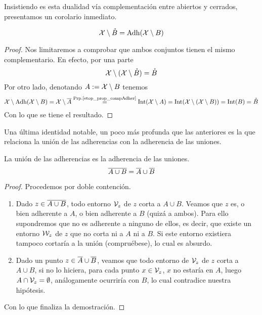 Insistiendo es esta dualidad vía complementación entre abiertos y cerrados, presentamos un corolario inmediato.
\begin{cor}
	\label{etop_cor_compInter}
	\begin{equation*}
	\mathcal{X}\setminus\mathring{B}=\operatorname{\mathrm{Adh}}(\mathcal{X} \setminus B)
	\end{equation*}
\end{cor}
\begin{proof}
	Nos limitaremos a comprobar que ambos conjuntos tienen el mismo complementario. En efecto, por una parte
	\begin{equation*}
	\mathcal{X} \setminus (\mathcal{X} \setminus \mathring{B}) = \mathring{B}
	\end{equation*}
	Por otro lado, denotando $A:=\mathcal{X} \setminus B$ tenemos
	\begin{equation*}
	\mathcal{X} \setminus \operatorname{\mathrm{Adh}}(\mathcal{X} \setminus B)=\mathcal{X} \setminus \overline{A}\stackrel{\textrm{Prp.\ref{etop_prop_compAdher}}}{=}\operatorname{\mathrm{Int}}(\mathcal{X} \setminus A)=\operatorname{\mathrm{Int}}(\mathcal{X} \setminus (\mathcal{X} \setminus B))=\operatorname{\mathrm{Int}}(B)=\mathring{B}
	\end{equation*}
	Con lo que se tiene el resultado.
\end{proof}
Una última identidad notable, un poco más profunda que las anteriores es la que relaciona la unión de las adherencias con la adherencia de las uniones.
\begin{prop}
	La unión de las adherencias es la adherencia de las uniones.
	\label{etop_prop_unionAdher}
	\begin{equation*}
	\overline{A\cup B}=\overline{A}\cup\overline{B}
	\end{equation*}
\end{prop}
\begin{proof}
	Procedemos por doble contención.
	\begin{enumerate}
		\item[\bsubset] 
		Dado $z\in \overline{A\cup B}$, todo entorno $\mathcal{V}_z$ de $z$ corta a $A\cup B$. Veamos que $z$ es, o bien adherente a $A$, o bien adherente a $B$ (quizá a ambos). Para ello supondremos que no es adherente a ninguno de ellos, es decir, que existe un entorno $\mathcal{W}_z$ de $z$ que no corta ni a $A$ ni a $B$. Si este entorno existiera tampoco cortaría a la unión (compruébese), lo cual es absurdo.
		\item[\bsupset]
		Dado un punto $z\in\overline{A}\cup\overline{B}$, veamos que todo entorno de $\mathcal{V}_z$ de $z$ corta a $A\cup B$, si no lo hiciera, para cada punto $x\in\mathcal{V}_z$, $x$ no estaría en $A$, luego $A\cap \mathcal{V}_z=\emptyset$, análogamente ocurriría con $B$, lo cual contradice nuestra hipótesis.
	\end{enumerate}
	Con lo que finaliza la demostración.
\end{proof}
